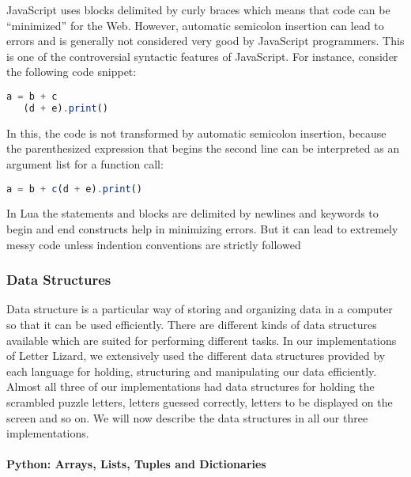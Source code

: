 JavaScript uses blocks delimited by curly braces which means that code can be ``minimized'' for the Web. However, automatic semicolon insertion can lead to errors and is generally not considered very good by JavaScript programmers. This is one of the controversial syntactic features of JavaScript. For instance, consider the following code snippet:
\begin{lstlisting}[language={JavaScript},caption=An example where automatic semicolon insertion in JavaScript may lead to unexpected results]
	a = b + c
   (d + e).print()
\end{lstlisting}

In this, the code is not transformed by automatic semicolon insertion, because the parenthesized expression that begins the second line can be interpreted as an argument list for a function call:

\begin{lstlisting}[language={JavaScript}, %
  title={}, label=semicolon]
	a = b + c(d + e).print()
\end{lstlisting}

In Lua the statements and blocks are delimited by newlines and keywords to begin and end constructs help in minimizing errors. But it can lead to extremely messy code unless indention conventions are strictly followed


\subsubsection{Data Structures}

Data structure is a particular way of storing and organizing data in a computer so that it can be used efficiently. There are different kinds of data structures available which are suited for performing different tasks. In our implementations of Letter Lizard, we extensively used the different data structures provided by each language for holding, structuring and manipulating our data efficiently. Almost all three of our implementations had data structures for holding the scrambled puzzle letters, letters guessed correctly, letters to be displayed on the screen and so on. We will now describe the data structures in all our three implementations.
\paragraph{Python: Arrays, Lists, Tuples and Dictionaries}

